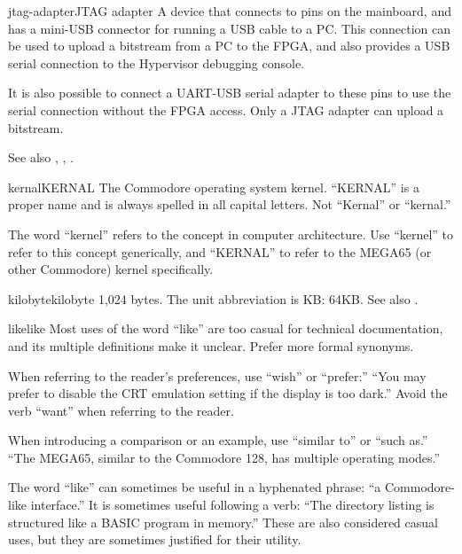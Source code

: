 \begin{sgentry}{jtag-adapter}{JTAG adapter}
    A device that connects to pins on the mainboard, and has a mini-USB connector for running a USB cable to a PC. This connection can be used to upload a bitstream from a PC to the FPGA, and also provides a USB serial connection to the Hypervisor debugging console.

    It is also possible to connect a UART-USB serial adapter to these pins to use the serial connection without the FPGA access. Only a JTAG adapter can upload a bitstream.

    See also , , .
\end{sgentry}

\begin{sgentry}{kernal}{KERNAL}
    The Commodore operating system kernel. ``KERNAL'' is a proper name and is always spelled in all capital letters. Not ``Kernal'' or ``kernal.''

    The word ``kernel'' refers to the concept in computer architecture. Use ``kernel'' to refer to this concept generically, and ``KERNAL'' to refer to the MEGA65 (or other Commodore) kernel specifically.
\end{sgentry}

\begin{sgentry}{kilobyte}{kilobyte}
    1,024 bytes. The unit abbreviation is KB: 64KB. See also .
\end{sgentry}

\begin{sgentry}{like}{like}
    Most uses of the word ``like'' are too casual for technical documentation, and its multiple definitions make it unclear. Prefer more formal synonyms.

    When referring to the reader's preferences, use ``wish'' or ``prefer:'' ``You may prefer to disable the CRT emulation setting if the display is too dark.'' Avoid the verb ``want'' when referring to the reader.

    When introducing a comparison or an example, use ``similar to'' or ``such as.'' ``The MEGA65, similar to the Commodore 128, has multiple operating modes.''

    The word ``like'' can sometimes be useful in a hyphenated phrase: ``a Commodore-like interface.'' It is sometimes useful following a verb: ``The directory listing is structured like a BASIC program in memory.'' These are also considered casual uses, but they are sometimes justified for their utility.
\end{sgentry}

